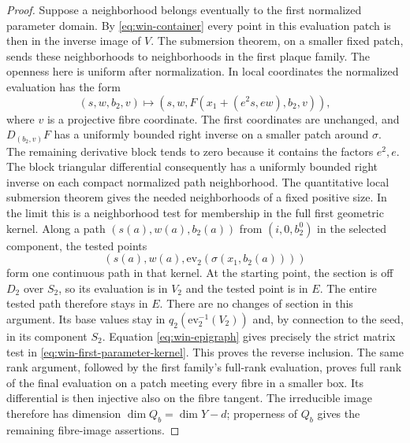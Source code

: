 \begin{proof}
Suppose a neighborhood belongs eventually to the first normalized parameter domain.  By \eqref{eq:win-container} every point in this evaluation patch is then in the inverse image of $V$.  The submersion theorem, on a smaller fixed patch, sends these neighborhoods to neighborhoods in the first plaque family. The openness here is uniform after normalization.  In local coordinates the normalized evaluation has the form
\[
 (s,w,b_2,v)\longmapsto
 (s,w,F(x_1+(e^2s,ew),b_2,v)),
\]
where $v$ is a projective fibre coordinate.  The first coordinates are unchanged, and $D_{(b_2,v)}F$ has a uniformly bounded right inverse on a smaller patch around $\sigma$.  The remaining derivative block tends to zero because it contains the factors $e^2,e$.  The block triangular differential consequently has a uniformly bounded right inverse on each compact normalized path neighborhood.  The quantitative local submersion theorem gives the needed neighborhoods of a fixed positive size.  In the limit this is a neighborhood test for membership in the full first geometric kernel.  Along a path $(s(a),w(a),b_2(a))$ from $(i,0,b_2^0)$ in the selected component, the tested points
\[
       (s(a),w(a),\mathrm{ev}_2(\sigma(x_1,b_2(a))))
\]
form one continuous path in that kernel.  At the starting point, the section is off $D_2$ over $S_2$, so its evaluation is in $V_2$ and the tested point is in $E$.  The entire tested path therefore stays in $E$.  There are no changes of section in this argument. Its base values stay in $q_2(\mathrm{ev}_2^{-1}(V_2))$ and, by connection to the seed, in its component $S_2$.  Equation \eqref{eq:win-epigraph} gives precisely the strict matrix test in \eqref{eq:win-first-parameter-kernel}.  This proves the reverse inclusion.  The same rank argument, followed by the first family's full-rank evaluation, proves full rank of the final evaluation on a patch meeting every fibre in a smaller box.  Its differential is then injective also on the fibre tangent.  The irreducible image therefore has dimension $\dim Q_b=\dim Y-d$; properness of $Q_b$ gives the remaining fibre-image assertions.


\end{proof}
